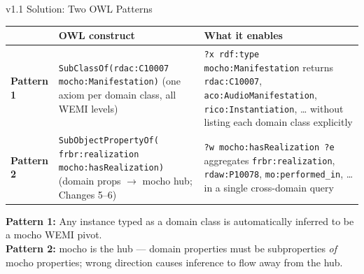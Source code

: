 \documentclass[xcolor,aspectratio=169,compress]{beamer}
\begin{document}
\begin{frame}[shrink=5]{v1.1 Solution: Two OWL Patterns}
  \small
  \begin{tabular}{>{\bfseries}p{1.5cm}>{\raggedright\arraybackslash}p{5.5cm}>{\raggedright\arraybackslash}p{4.0cm}}
    \toprule
    & OWL construct & What it enables \\
    \midrule
    Pattern 1 &
      \texttt{SubClassOf(rdac:C10007 mocho:Manifestation)} \newline
      (one axiom per domain class, all WEMI levels) &
      \texttt{?x rdf:type mocho:Manifestation} returns \texttt{rdac:C10007},
      \texttt{aco:AudioManifestation}, \texttt{rico:Instantiation}, \ldots
      without listing each domain class explicitly \\[6pt]
    Pattern 2 &
      \texttt{SubObjectPropertyOf(} \newline
      \texttt{frbr:realization mocho:hasRealization)} \newline
      (domain props $\to$ mocho hub; Changes 5--6) &
      \texttt{?w mocho:hasRealization ?e} aggregates \texttt{frbr:realization},
      \texttt{rdaw:P10078}, \texttt{mo:performed\_in}, \ldots
      in a single cross-domain query \\
    \bottomrule
  \end{tabular}

  \smallskip
  \footnotesize
  \textbf{Pattern 1:} Any instance typed as a domain class is automatically inferred to be a mocho WEMI pivot. \\
  \textbf{Pattern 2:} mocho is the hub --- domain properties must be subproperties \emph{of} mocho properties;
  wrong direction causes inference to flow away from the hub.
\end{frame}
\end{document}
